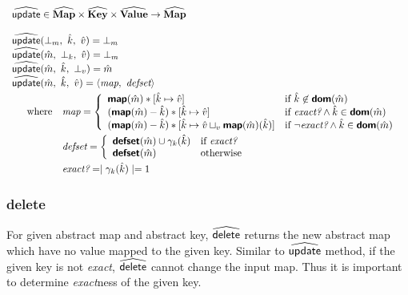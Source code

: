 $\begin{array}{l}
\wsf{update} \in \AMap \times \AKey \times \AVal \rightarrow \AMap \\\\

\wsf{update}(\bot_m,\ \hat{k},\ \hat{v}) = \bot_m \\
\wsf{update}(\hat{m},\ \bot_k,\ \hat{v}) = \bot_m \\
\wsf{update}(\hat{m},\ \hat{k},\ \bot_{v}) = \hat{m} \\

\wsf{update}(\hat{m},\ \hat{k},\ \hat{v}) = \langle \emph{map},\ \emph{defset} \rangle \vspace{1mm}\\
\quad \begin{array}{rl} \textrm{where}
& \emph{map} = \left \{ \begin{array}{ll}
\Map(\hat{m}) \ast [ \hat{k} \mapsto \hat{v} ]
& \textrm{if } \hat{k} \not\in \Dom(\hat{m}) \\

(\Map(\hat{m}) - \hat{k}) \ast [ \hat{k} \mapsto \hat{v}]
& \textrm{if } \emph{exact?} \land \hat{k}\in \Dom(\hat{m}) \\

(\Map(\hat{m}) - \hat{k})
\ast [ \hat{k} \mapsto \hat{v} \sqcup_v \Map(\hat{m})(\hat{k}) ]
& \textrm{if } \neg \emph{exact?} \land \hat{k}\in \Dom(\hat{m}) \\
\end{array} \right. \vspace{1mm}\\

& \emph{defset} = \left \{ \begin{array}{ll}
\Defset(\hat{m}) \cup \gamma_k(\hat{k}) & \textrm{if} ~ \emph{exact?} \\
\Defset(\hat{m}) & \textrm{otherwise}\\
\end{array} \right. \vspace{1mm}\\

& \emph{exact?} = \mid \gamma_k(\hat{k}) \mid = 1 \\
\end{array} \\
\end{array} $

\subsubsection{delete}
For given abstract map and abstract key, 
$\widehat{\textsf{delete}}$ returns the new abstract map 
which have no value mapped to the given key.
Similar to $\widehat{\textsf{update}}$ method, 
if the given key is not \emph{exact},
$\widehat{\textsf{delete}}$ cannot change the input map.
Thus it is important to determine \emph{exact}ness of the given key.\\

